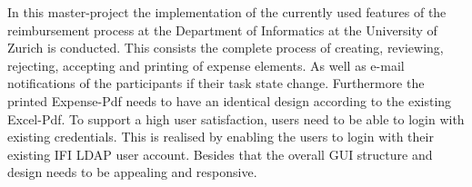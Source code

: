 In this master-project the implementation of the currently used features of the reimbursement process at the Department of Informatics at the University of Zurich is conducted. This consists the complete process of creating, reviewing, rejecting, accepting and printing of expense elements. As well as e-mail notifications of the participants if their task state change. Furthermore the printed Expense-Pdf needs to have an identical design according to the existing Excel-Pdf.\newline 
To support a high user satisfaction, users need to be able to login with existing credentials. This is realised by enabling the users to login with their existing IFI LDAP user account. Besides that the overall GUI structure and design needs to be appealing and responsive.